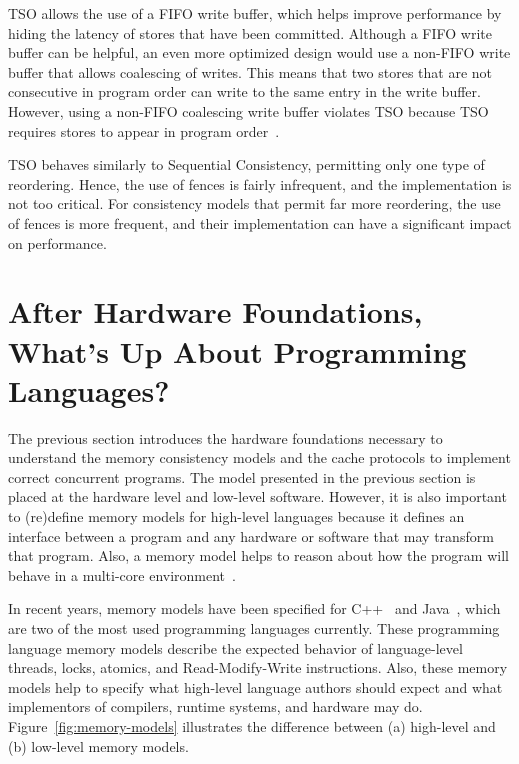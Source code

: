 TSO allows the use of a FIFO write buffer, which helps improve performance by hiding the latency of stores that have been committed. Although a FIFO write buffer can be helpful, an even more optimized design would use a non-FIFO write buffer that allows coalescing of writes. This means that two stores that are not consecutive in program order can write to the same entry in the write buffer. However, using a non-FIFO coalescing write buffer violates TSO because TSO requires stores to appear in program order~\cite{DBLP_series_synthesis_2020Nagarajan}.

TSO behaves similarly to Sequential Consistency, permitting only one type of reordering. Hence, the use of fences is fairly infrequent, and the implementation is not too critical. For consistency models that permit far more reordering, the use of fences is more frequent, and their implementation can have a significant impact on performance.



\section{After Hardware Foundations, What's Up About Programming Languages?}

The previous section introduces the hardware foundations necessary to understand the memory consistency models and the cache protocols to implement correct concurrent programs. The model presented in the previous section is placed at the hardware level and low-level software. However, it is also important to (re)define memory models for high-level languages because it defines an interface between a program and any hardware or software that may transform that program. Also, a memory model helps to reason about how the program will behave in a multi-core environment~\cite{DBLP_journals_cacm_AdveB10, DBLP_series_synthesis_2020Nagarajan}.

In recent years, memory models have been specified for C++~\cite{DBLP_conf_pldi_BoehmA08} and Java~\cite{DBLP_conf_popl_MansonPA05}, which are two of the most used programming languages currently. These programming language memory models describe the expected behavior of language-level threads, locks, atomics, and Read-Modify-Write instructions. Also, these memory models help to specify what high-level language authors should expect and what implementors of compilers, runtime systems, and hardware may do. Figure~\ref{fig:memory-models} illustrates the difference between (a) high-level and (b) low-level memory models.

